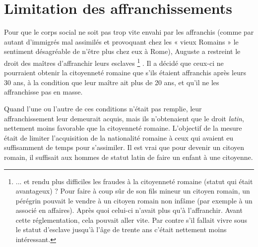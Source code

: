 \section{Limitation des affranchissements}

 Pour que le corps social ne soit pas trop vite envahi par les affranchis (comme par autant d'immigrés mal assimilés et provoquant chez les « vieux Romains » le sentiment désagréable de n'être plus chez eux à Rome), Auguste a restreint le droit des maîtres d'affranchir leurs esclaves%
\footnote{... et rendu plus difficiles les fraudes à la citoyenneté romaine (statut qui était avantageux) ? Pour faire à coup sûr de son fils mineur un citoyen romain, un pérégrin pouvait le vendre à un citoyen romain non infâme (par exemple à un associé en affaires). Après quoi celui-ci n'avait plus qu'à l'affranchir. Avant cette réglementation, cela pouvait aller vite. Par contre s'il fallait vivre sous le statut d'esclave jusqu'à l'âge de trente ans c'était nettement moins intéressant.}%
. Il a décidé que ceux-ci ne pourraient obtenir la citoyenneté romaine que s'ils étaient affranchis après leurs 30 ans, à la condition que leur maître ait plus de 20 ans, et qu'il ne les affranchisse pas en masse. 

 Quand l'une ou l'autre de ces conditions n'était pas remplie, leur affranchissement leur demeurait acquis, mais ils n'obtenaient que le droit \emph{latin}, nettement moins favorable que la citoyenneté romaine. L'objectif de la mesure était de limiter l'acquisition de la nationalité romaine à ceux qui avaient eu suffisamment de temps pour s'assimiler. Il est vrai que pour devenir un citoyen romain, il suffisait aux hommes de statut latin de faire un enfant à une citoyenne.
 
 